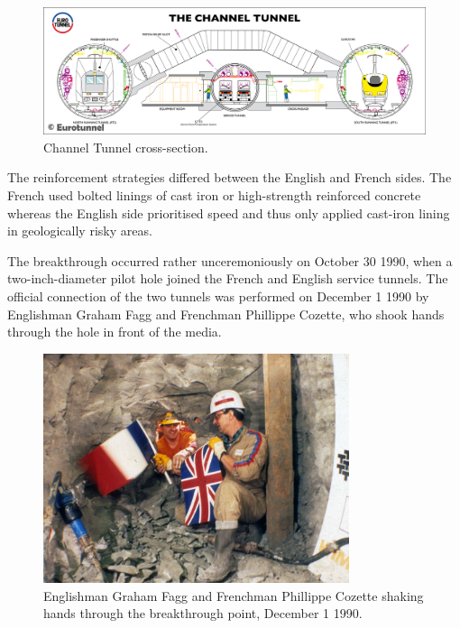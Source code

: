 \documentclass[12pt]{article} %
\begin{document}
\begin{figure}[tp]
  \centering
  \includegraphics[width=\textwidth]{tunnelcross}
  \caption{Channel Tunnel cross-section.}
  \label{fig:cross}
\end{figure}

The reinforcement strategies differed between the English and French sides. The French used bolted linings of cast iron or high-strength reinforced concrete whereas the English side prioritised speed and thus only applied cast-iron lining in geologically risky areas.

The breakthrough occurred rather unceremoniously on October 30 1990, when a two-inch-diameter pilot hole joined the French and English service tunnels. The official connection of the two tunnels was performed on December 1 1990 by Englishman Graham Fagg and Frenchman Phillippe Cozette, who shook hands through the hole in front of the media.

\begin{figure}[tp]
  \centering
  \includegraphics[width=0.8\textwidth]{breakthrough}
  \caption{Englishman Graham Fagg and Frenchman Phillippe Cozette shaking hands through the breakthrough point, December 1 1990.}
  \label{fig:break}
\end{figure}
\end{document}
